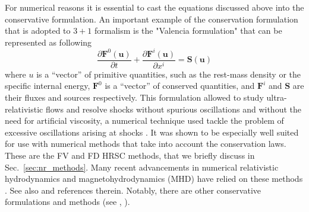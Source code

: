 For numerical reasons it is essential to cast the equations discussed above into the conservative formulation.
%
An important example of the conservation formulation that is adopted to $3 + 1$ formalism 
is the "Valencia formulation" \citep{Banyuls:1997} that can be represented as following
%
\begin{equation}
\frac{\partial\boldsymbol{F}^{0}(\boldsymbol{u})}{\partial t} + \frac{\partial\boldsymbol{F}^{i}(\boldsymbol{u})}{\partial x^{i}} = \boldsymbol{S}(\boldsymbol{u})
\label{eq:theory:valencia_formalism}
\end{equation}
%
where $u$ is a “vector” of primitive quantities, such as the rest-mass density or the specific internal energy,
$\boldsymbol{F}^0$ is a “vector” of conserved quantities, and $\boldsymbol{F}^i$ and $\boldsymbol{S}$ 
are their fluxes and sources respectively. 
%
This formulation allowed to study ultra-relativistic flows and resolve shocks without spurious 
oscillations and without the need for artificial viscosity, a numerical technique used 
tackle the problem of excessive oscillations arising at shocks \citep[\eg][]{Font:2008fka}.
%
It was shown to be especially well suited for use with numerical methods that take 
into account the conservation laws. These are the \ac{FV} and \ac{FD} \ac{HRSC} methods, 
that we briefly discuss in Sec.~\ref{sec:nr_methods}.
%
Many recent advancements in numerical relativistic hydrodynamics and magnetohydrodynamics (MHD) have relied on these methods \citep[\eg][]{Shibata:2005gp,Giacomazzo:2010bx,Rezzolla:2011da,Radice:2013xpa}. See also \citet{Shibata:2016}
and references therein.
%
Notably, there are other conservative formulations and methods (see \eg, \citet{Papadopoulos:1999kt}). 


